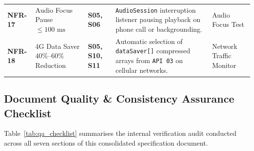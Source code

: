 \begin{table}[H]
\begin{tabularx}{\textwidth}{C{1.35cm} L{3.1cm} C{1.55cm} Y L{2.9cm}}
\mbox{\textbf{NFR-17}} & Audio Focus Pause $\le 100\text{ ms}$ & \textbf{S05, S06} & \texttt{AudioSession} interruption listener pausing playback on phone call or backgrounding. & Audio Focus Test \\
\mbox{\textbf{NFR-18}} & 4G Data Saver $40\%\text{--}60\%$ Reduction & \textbf{S05, S10, S11} & Automatic selection of \texttt{dataSaver[]} compressed arrays from \texttt{API 03} on cellular networks. & Network Traffic Monitor \\
\bottomrule
\end{tabularx}
\end{table}

\newpage
\subsection{Document Quality \& Consistency Assurance Checklist}
\label{subsec:qa_checklist}

Table~\ref{tab:qa_checklist} summarises the internal verification audit conducted across all seven sections of this consolidated specification document.


